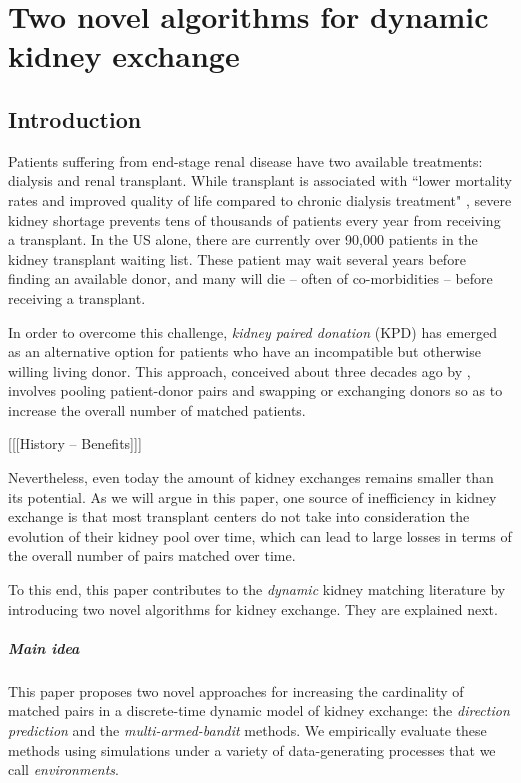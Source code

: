 \chapter{Two novel algorithms for dynamic kidney exchange}

\doublespacing

\section{Introduction}

Patients suffering from end-stage renal disease have two available treatments: dialysis and renal transplant. While transplant is associated with ``lower mortality rates and improved quality of life compared to chronic dialysis treatment" \citep{tonelli2011systematic}, severe kidney shortage prevents tens of thousands of patients every year from receiving a transplant. In the US alone, there are currently over 90,000 patients in the kidney transplant waiting list. These patient may wait several years before finding an available donor, and many will die -- often of co-morbidities -- before receiving a transplant.

In order to overcome this challenge, \emph{kidney paired donation} (KPD) has emerged as an alternative option for patients who have an incompatible but otherwise willing living donor. This approach, conceived about three decades ago by \cite{rapaport1986case}, involves pooling patient-donor pairs and swapping or exchanging donors so as to increase the overall number of matched patients.

[[[History -- Benefits]]]

Nevertheless, even today the amount of kidney exchanges remains smaller than its potential. As we will argue in this paper, one source of inefficiency in kidney exchange is that most transplant centers do not take into consideration the evolution of their kidney pool over time, which can lead to large losses in terms of the overall number of pairs matched over time.

To this end, this paper contributes to the \emph{dynamic} kidney matching literature by introducing two novel algorithms for kidney exchange. They are explained next.

\paragraph{\textbf{Main idea}} This paper proposes two novel approaches for increasing the cardinality of matched pairs in a discrete-time dynamic model of kidney exchange: the \emph{direction prediction} and the \emph{multi-armed-bandit} methods. We empirically evaluate these methods using simulations under a variety of data-generating processes that we call \emph{environments}. 

